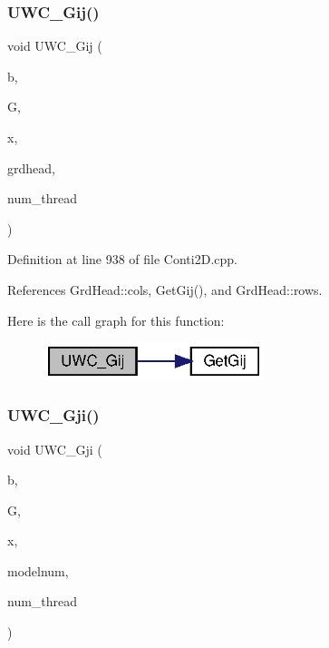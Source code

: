 \subsubsection{U\+W\+C\+\_\+\+Gij()\hspace{0.1cm}{\footnotesize\ttfamily [2/2]}}
{\footnotesize\ttfamily void U\+W\+C\+\_\+\+Gij (\begin{DoxyParamCaption}\item[{double $\ast$}]{b,  }\item[{double $\ast$}]{G,  }\item[{double $\ast$}]{x,  }\item[{\textbf{ Grd\+Head}}]{grdhead,  }\item[{int}]{num\+\_\+thread }\end{DoxyParamCaption})}



Definition at line 938 of file Conti2\+D.\+cpp.



References Grd\+Head\+::cols, Get\+Gij(), and Grd\+Head\+::rows.

Here is the call graph for this function\+:
\nopagebreak
\begin{figure}[H]
\begin{center}
\leavevmode
\includegraphics[width=182pt]{Conti2D_8cpp_a0cc3e78b4faaa9da0728fdc85057425d_a0cc3e78b4faaa9da0728fdc85057425d_cgraph}
\end{center}
\end{figure}
\mbox{\label{Conti2D_8cpp_a9d30373a0ff29e4f743eaf5e4cbc3cbf_a9d30373a0ff29e4f743eaf5e4cbc3cbf}} 
\subsubsection{U\+W\+C\+\_\+\+Gji()\hspace{0.1cm}{\footnotesize\ttfamily [1/2]}}
{\footnotesize\ttfamily void U\+W\+C\+\_\+\+Gji (\begin{DoxyParamCaption}\item[{double $\ast$}]{b,  }\item[{double $\ast$$\ast$}]{G,  }\item[{double $\ast$}]{x,  }\item[{int}]{modelnum,  }\item[{int}]{num\+\_\+thread }\end{DoxyParamCaption})}



